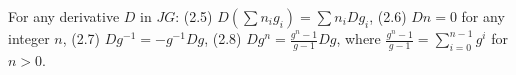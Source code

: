 For any derivative $D$ in $JG$:
(2.5) $D(\sum n_i g_i) = \sum n_i D g_i$,
(2.6) $D n = 0$ for any integer $n$,
(2.7) $D g^{-1} = -g^{-1} D g$,
(2.8) $D g^n = \frac{g^n - 1}{g - 1} D g$, where $\frac{g^n-1}{g-1} = \sum_{i=0}^{n-1} g^i$ for $n > 0$.
